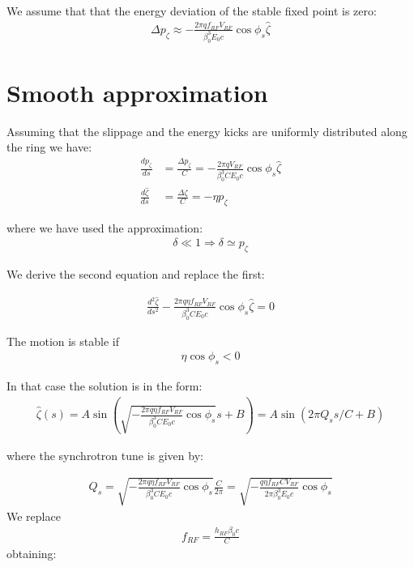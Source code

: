 We assume that that the energy deviation of the stable fixed point is zero:
\begin{align}
\Delta {p}_\zeta \approx -\frac{2\pi q f_{RF} V_{RF}}{\beta_0^3 E_0 c}\cos{\phi_s}\hat{\zeta}
\label{eq:deltapzeta}
\end{align}





\section{Smooth approximation}

Assuming that the slippage and the energy kicks are uniformly distributed along the ring we have:
\begin{align}
\frac{dp_\zeta}{d s} &= \frac{\Delta {p}_\zeta}{C}
=-\frac{2\pi q V_{RF}}{\beta_0^3 C E_0 c}\cos{\phi_s}\hat{\zeta}
\\
\frac{d\hat{\zeta}}{d s} &= \frac{\Delta \zeta}{C} = -\eta p_\zeta
\label{eg:dzeta_ds}
\end{align}

where we have used the approximation:
\begin{align}
\delta \ll 1  \Rightarrow \delta \simeq p_\zeta
\end{align}

We derive the second equation and replace the first:

\begin{align}
\frac{d^2\hat{\zeta}}{d s^2}  -  \frac{2\pi q \eta f_{RF} V_{RF}}{\beta_0^3 C E_0 c}\cos{\phi_s}\hat{\zeta} = 0
\end{align}

The motion is stable if
\begin{align}
\eta \cos{\phi_s} < 0
\end{align}

In that case the solution is in the form:
\begin{align}
\hat{\zeta}(s) = A \sin\left( \sqrt{-  \frac{2\pi q \eta f_{RF} V_{RF}}{\beta_0^3 C E_0 c}\cos{\phi_s}} s + B\right) = A \sin\left( 2 \pi Q_s s/C + B\right)
\end{align}

where the synchrotron tune is given by:


\begin{align}
Q_s = \sqrt{-  \frac{2\pi q \eta f_{RF} V_{RF}}{\beta_0^3 C E_0 c}\cos{\phi_s}} \frac{C}{2\pi}
= \sqrt{-  \frac{ q \eta f_{RF} C V_{RF}}{2\pi\beta_0^3 E_0 c}\cos{\phi_s}}
\end{align}
We replace
\begin{align}
f_{RF} = 
\frac{h_{RF} {\beta_0 c}}{C}
\end{align}
obtaining:

